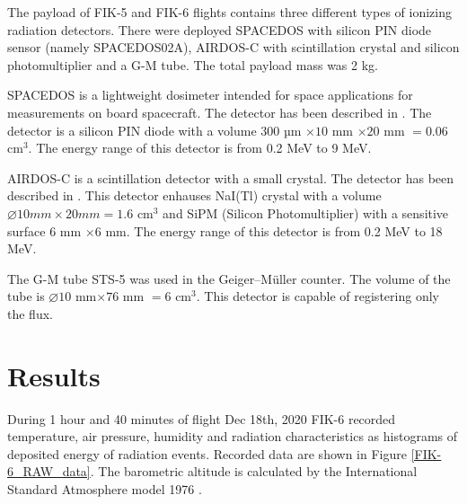 \documentclass{Rpd}
\begin{document}
The payload of FIK-5 and FIK-6 flights contains three different types of ionizing radiation detectors. There were deployed SPACEDOS with silicon PIN diode sensor (namely SPACEDOS02A), AIRDOS-C with scintillation crystal and silicon photomultiplier and a G-M tube. The total payload mass was 2 kg.

SPACEDOS is a lightweight dosimeter intended for space applications for measurements on board spacecraft. The detector has been described in \cite{SPACEDOS}. The detector is a silicon PIN diode with a volume $300$ µm $\times 10$ mm $\times 20$ mm $= 0.06$ cm$^3$. The energy range of this detector is from 0.2 MeV to 9 MeV.

AIRDOS-C is a scintillation detector with a small crystal. The detector has been described in \cite{AIRDOS-C}. This detector enhauses NaI(Tl) crystal with a volume   $\diameter 10 mm \times 20 mm = 1.6$ cm$^3$ and SiPM (Silicon Photomultiplier) with a sensitive surface $6$ mm $\times 6$ mm. The energy range of this detector is from 0.2 MeV to 18 MeV.

The G-M tube STS-5 was used in the Geiger–Müller counter. The volume of the tube is $\diameter 10$ mm$ \times 76$ mm $= 6$ cm$^3$. This detector is capable of registering only the flux.

\section{Results}

During 1 hour and 40 minutes of flight Dec 18th, 2020 FIK-6 recorded temperature, air pressure, humidity and radiation characteristics as histograms of deposited energy of radiation events. Recorded data are shown in Figure \ref{FIK-6_RAW_data}. The barometric altitude is calculated by the International Standard Atmosphere model 1976 \cite{standard_atmosphere}. 
\end{document}
